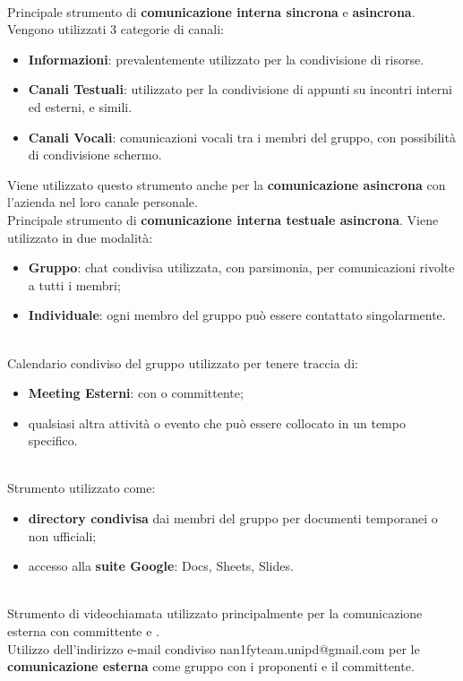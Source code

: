 \\
Principale strumento di \textbf{comunicazione interna sincrona} e \textbf{asincrona}. Vengono utilizzati 3 categorie di canali:
\begin{itemize}
  \item \textbf{Informazioni}: prevalentemente utilizzato per la condivisione di risorse.
  \item \textbf{Canali Testuali}: utilizzato per la condivisione di appunti su incontri interni ed esterni, e simili.
  \item \textbf{Canali Vocali}: comunicazioni vocali tra i membri del gruppo, con possibilità di condivisione schermo.
\end{itemize}
\medskip
Viene utilizzato questo strumento anche per la \textbf{comunicazione asincrona} con l'azienda
 nel loro canale personale.
\\
Principale strumento di \textbf{comunicazione interna testuale asincrona}. Viene utilizzato in due modalità:
\begin{itemize}
  \item \textbf{Gruppo}: chat condivisa utilizzata, con parsimonia, per comunicazioni rivolte a tutti i membri;
  \item \textbf{Individuale}: ogni membro del gruppo può essere contattato singolarmente.
\end{itemize}
\medskip
{}\\
Calendario condiviso del gruppo utilizzato per tenere traccia di:
\begin{itemize}
  \item \textbf{Meeting Esterni}: con  o committente;
  \item qualsiasi altra attività o evento che può essere collocato in un tempo specifico.
\end{itemize}
\\
Strumento utilizzato come:
\begin{itemize}
  \item \textbf{directory condivisa} dai membri del gruppo per documenti temporanei o non ufficiali;
  \item accesso alla \textbf{suite Google}: Docs, Sheets, Slides.
\end{itemize}
\\
Strumento di videochiamata utilizzato principalmente per la comunicazione esterna con committente e
.
\\
Utilizzo dell'indirizzo e-mail condiviso nan1fyteam.unipd@gmail.com per le \textbf{comunicazione esterna} come gruppo con i proponenti e il committente.
